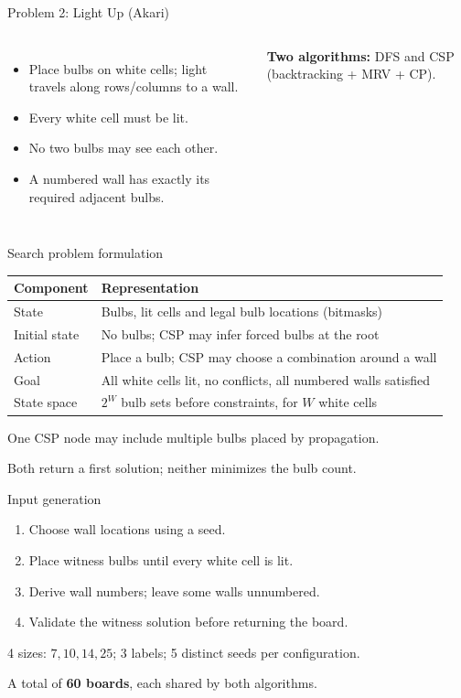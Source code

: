 \begin{frame}{Problem 2: Light Up (Akari)}
\begin{columns}[c,onlytextwidth]
\centering
{}\begin{itemize}
\item Place bulbs on white cells; light travels along rows/columns to a wall.
\item Every white cell must be lit.
\item No two bulbs may see each other.
\item A numbered wall has exactly its required adjacent bulbs.
\end{itemize}\vspace{3mm}
\textbf{Two algorithms:} DFS and CSP (backtracking + MRV + CP).
\end{columns}
\end{frame}

\begin{frame}{Search problem formulation}
\small\begin{tabular}{@{}p{}p{}@{}}\toprule
Component & Representation\\\midrule
State & Bulbs, lit cells and legal bulb locations (bitmasks)\\
Initial state & No bulbs; CSP may infer forced bulbs at the root\\
Action & Place a bulb; CSP may choose a combination around a wall\\
Goal & All white cells lit, no conflicts, all numbered walls satisfied\\
State space & $2^W$ bulb sets before constraints, for $W$ white cells\\\bottomrule
\end{tabular}
\vspace{3mm}\par
One CSP node may include multiple bulbs placed by propagation.\par
Both return a first solution; neither minimizes the bulb count.
\end{frame}

\begin{frame}{Input generation}
\begin{enumerate}
\item Choose wall locations using a seed.
\item Place witness bulbs until every white cell is lit.
\item Derive wall numbers; leave some walls unnumbered.
\item Validate the witness solution before returning the board.
\end{enumerate}
\vspace{3mm}\small
4 sizes: $7,10,14,25$; 3 labels; 5 distinct seeds per configuration.\par
A total of \textbf{60 boards}, each shared by both algorithms.
\end{frame}

